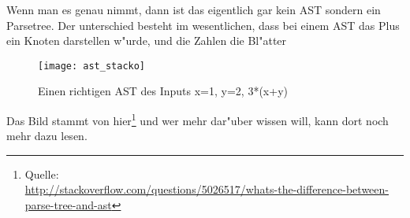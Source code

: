Wenn man es genau nimmt, dann ist das eigentlich gar kein AST sondern ein Parsetree. Der unterschied besteht im wesentlichen, dass bei einem AST das Plus ein Knoten darstellen w"urde, und die Zahlen die Bl"atter

\begin{figure}[H]
	\centering
	\texttt{[image: ast\_stacko]}
	\caption{Einen richtigen AST des Inputs x=1, y=2, 3*(x+y)}
\end{figure}

Das Bild stammt von hier\footnote{Quelle:\\ \url{http://stackoverflow.com/questions/5026517/whats-the-difference-between-parse-tree-and-ast}} und wer mehr dar"uber wissen will, kann dort noch mehr dazu lesen.











